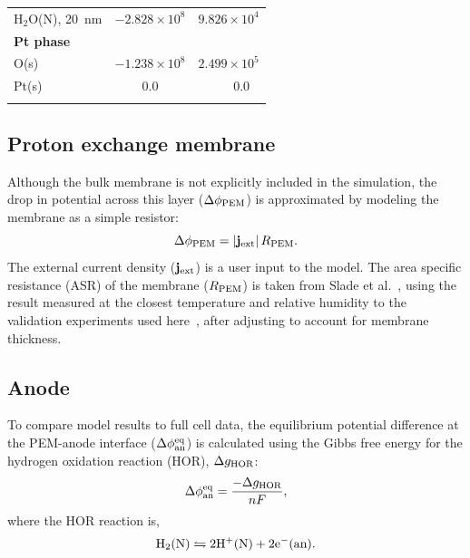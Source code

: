 \documentclass[final,3p,times,twocolumn]{elsarticle}    %
\begin{document}
\begin{table}[!t]
\begin{tabular}{l r r}
    \hspace{7px}H$_2$O(N), 20~nm   &$-2.828\times10^{8}$          &$9.826\times10^{4}$ \\
    {\bf Pt phase}&&\\
    \hspace{7px}O(s)               &$-1.238\times10^{8}$          &$2.499\times10^{5}$ \\
    \hspace{7px}Pt(s)              &\multicolumn{1}{c}{$0.0$}     &\multicolumn{1}{c}{$\qquad0.0$} \\
    \hline \hline \vspace*{-3mm} 
    \end{tabular}
    \label{tab:thermo}
\end{table}
\subsection{Proton exchange membrane}
\label{sect:pem}

Although the bulk membrane is not explicitly included in the simulation, the drop in potential across this layer ($\Delta \phi_{\rm PEM}$) is approximated by modeling the membrane as a simple resistor:
\begin{equation}
    \Delta \phi_{\rm PEM} = \lvert{\bf j}_{\rm ext}\rvert\, R_{\rm PEM}.
\end{equation}
The external current density (${\bf j}_{\rm ext}$) is a user input to the model. The area specific resistance (ASR) of the membrane ($R_{\rm PEM}$) is taken from Slade et al.~\cite{bib:slade_2002}, using the result measured at the closest temperature and relative humidity to the validation experiments used here~\cite{bib:owejan_2013}, after adjusting to account for membrane thickness.

\subsection{Anode}
\label{sect:anode}

To compare model results to full cell data, the equilibrium potential difference at the PEM-anode interface ($\Delta \phi_{\rm an}^{\rm eq}$) is calculated using the Gibbs free energy for the hydrogen oxidation reaction (HOR), $\Delta g_{\rm HOR}$:
\begin{equation} \label{eq:phi-anode}
    \Delta \phi_{\rm an}^{\rm eq} = \frac{-\Delta g_{\rm HOR}}{n F},
\end{equation}
where the HOR reaction is,
\begin{equation}
    {\rm H_2(N) \leftrightharpoons 2H^{+}(N) + 2e^{-}(an).}
\end{equation}
\end{document}
